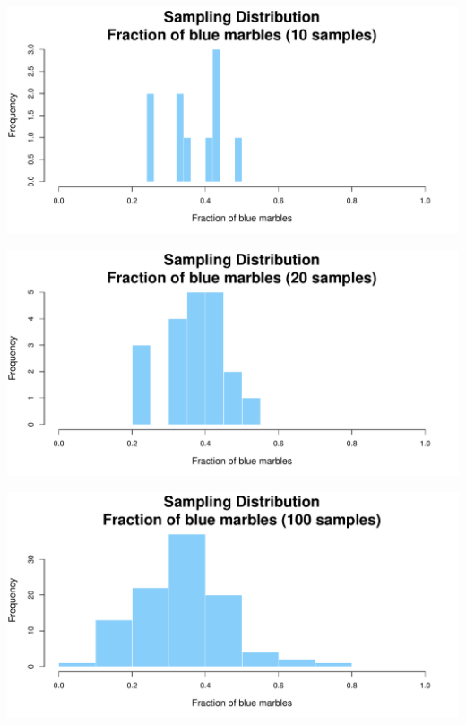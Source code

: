 \documentclass[aspectratio=169]{beamer}
\theoremstyle{principle}
\begin{document}
\begin{frame}
\begin{center}
\includegraphics[scale=0.57]{hist_10_samples.pdf}
\end{center}
\end{frame}

\begin{frame}
\begin{center}
\includegraphics[scale=0.57]{hist_20_samples.pdf}
\end{center}
\end{frame}

\begin{frame}
\begin{center}
\includegraphics[scale=0.57]{hist_100_samples.pdf}
\end{center}
\end{frame}
\end{document}
